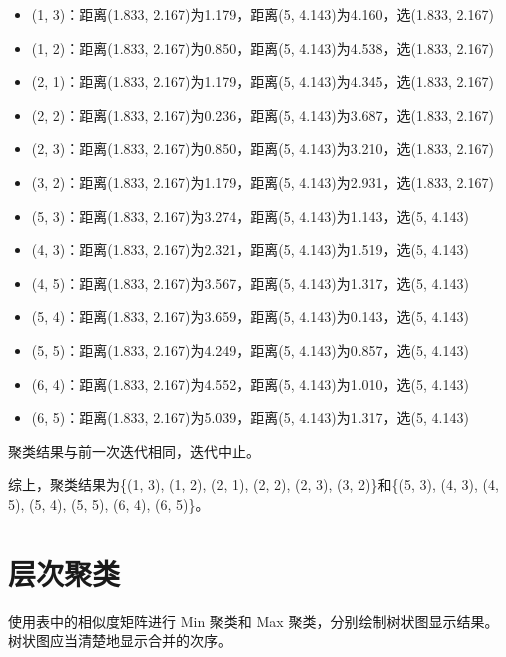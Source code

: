 \documentclass[12pt, UTF8]{article}
\begin{document}
\begin{enumerate}[label = Iter \arabic*:]
\begin{itemize}
    \item (1, 3)：距离(1.833, 2.167)为1.179，距离(5, 4.143)为4.160，选(1.833, 2.167)
    \item (1, 2)：距离(1.833, 2.167)为0.850，距离(5, 4.143)为4.538，选(1.833, 2.167)
    \item (2, 1)：距离(1.833, 2.167)为1.179，距离(5, 4.143)为4.345，选(1.833, 2.167)
    \item (2, 2)：距离(1.833, 2.167)为0.236，距离(5, 4.143)为3.687，选(1.833, 2.167)
    \item (2, 3)：距离(1.833, 2.167)为0.850，距离(5, 4.143)为3.210，选(1.833, 2.167)
    \item (3, 2)：距离(1.833, 2.167)为1.179，距离(5, 4.143)为2.931，选(1.833, 2.167)
    \item (5, 3)：距离(1.833, 2.167)为3.274，距离(5, 4.143)为1.143，选(5, 4.143)
    \item (4, 3)：距离(1.833, 2.167)为2.321，距离(5, 4.143)为1.519，选(5, 4.143)
    \item (4, 5)：距离(1.833, 2.167)为3.567，距离(5, 4.143)为1.317，选(5, 4.143)
    \item (5, 4)：距离(1.833, 2.167)为3.659，距离(5, 4.143)为0.143，选(5, 4.143)
    \item (5, 5)：距离(1.833, 2.167)为4.249，距离(5, 4.143)为0.857，选(5, 4.143)
    \item (6, 4)：距离(1.833, 2.167)为4.552，距离(5, 4.143)为1.010，选(5, 4.143)
    \item (6, 5)：距离(1.833, 2.167)为5.039，距离(5, 4.143)为1.317，选(5, 4.143)
  \end{itemize}
  聚类结果与前一次迭代相同，迭代中止。
\end{enumerate}

综上，聚类结果为\{(1, 3), (1, 2), (2, 1), (2, 2), (2, 3), (3, 2)\}和\{(5, 3), (4, 3), (4, 5), (5, 4), (5, 5), (6, 4), (6, 5)\}。

\section{层次聚类}

使用表中的相似度矩阵进行 Min 聚类和 Max 聚类，分别绘制树状图显示结果。树状图应当清楚地显示合并的次序。

\newpage
\end{document}
